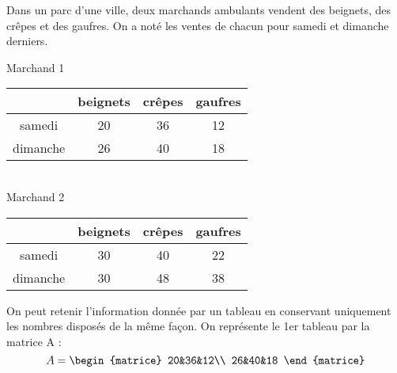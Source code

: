 \begin{exercice}

	Dans un parc d’une ville, deux marchands ambulants vendent des beignets,
	des crêpes et des gaufres. On a noté les ventes de chacun pour samedi et dimanche derniers.
	
	\begin{center}
		Marchand 1\\[1em]
		\tabstyled
		\begin{tabular}{|c|c|c|c|}
			\hline
			\bcell   & \ccell beignets & \ccell crêpes & \ccell gaufres \\
			\hline
			samedi   & 20              & 36            & 12             \\
			\hline
			dimanche & 26              & 40            & 18             \\
			\hline
		\end{tabular}\ \\[2em]
		
		Marchand 2\\[1em]
		
		\begin{tabular}{|c|c|c|c|}
			\hline
			\bcell   & \ccell beignets & \ccell crêpes & \ccell gaufres \\
			\hline
			samedi   & 30              & 40            & 22             \\
			\hline
			dimanche & 30              & 48            & 38             \\
			\hline
		\end{tabular}
	\end{center}
	
	
	On peut retenir l’information donnée par un tableau en conservant uniquement les
	nombres disposés de la même façon. On représente le 1er tableau par la matrice A :
	$$A=\begin{matrice}
			20&36&12\\
			26&40&18
		\end{matrice}$$
	

\end{exercice}
